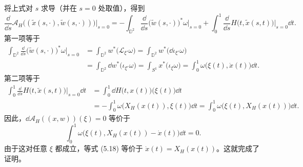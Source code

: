 \begin{wproof}[命题 5.4.1 的证明]
  将上式对 $s$ 求导（并在 $s=0$ 处取值），得到
  \[
    \frac{\dd}{\dd s}\mathcal{A}_H\bigl((\tilde x(s,\cdot),\tilde w(s,\cdot))\bigr)
      \Big|_{s=0}
      =-\int_{\mathbb{D}^2}\frac{\dd}{\dd s}\bigl(\tilde w(s,\cdot)\bigr)^*\omega
        \Big|_{s=0}
       +\int_0^1\frac{\dd}{\dd s}H\bigl(t,\tilde x(s,t)\bigr)\Big|_{s=0}\dd t.
  \]
  第一项等于
  \[
  \begin{aligned}
    \int_{\mathbb{D}^2}\frac{\dd}{\dd s}\bigl(\tilde w(s,\cdot)\bigr)^*\omega\Big|_{s=0}
      &=\int_{\mathbb{D}^2}w^*\bigl(\mathcal{L}_{\xi'}\omega\bigr)
       =\int_{\mathbb{D}^2}w^*\bigl(\dd\iota_{\xi'}\omega\bigr)\\
      &=\int_{\mathbb{D}^2}\dd w^*\bigl(\iota_{\xi'}\omega\bigr)
       =\int_{S^1}x^*\bigl(\iota_{\xi}\omega\bigr)
       =\int_0^1\omega\bigl(\xi(t),\dot x(t)\bigr)\dd t.
  \end{aligned}
  \]
  第二项等于
  \[
  \begin{aligned}
    \int_0^1\frac{\dd}{\dd s}H\bigl(t,\tilde x(s,t)\bigr)\Big|_{s=0}\dd t
      &=\int_0^1\dd H\bigl(t,x(t)\bigr)\bigl(\xi(t)\bigr)\dd t\\
      &=-\int_0^1\omega\bigl(X_H(x(t)),\xi(t)\bigr)\dd t
       =\int_0^1\omega\bigl(\xi(t),X_H(x(t))\bigr)\dd t.
  \end{aligned}
  \]
  因此，$\dd\mathcal{A}_H((x,w))(\xi)=0$ 等价于
  \begin{equation}\tag{5.18}
    \int_0^1\omega\bigl(\xi(t),X_H(x(t))-\dot x(t)\bigr)\dd t=0.
  \end{equation}
  由于这对任意 $\xi$ 都成立，等式 (5.18) 等价于 $\dot x(t)=X_H(x(t))$。这就完成了证明。
\end{wproof}


